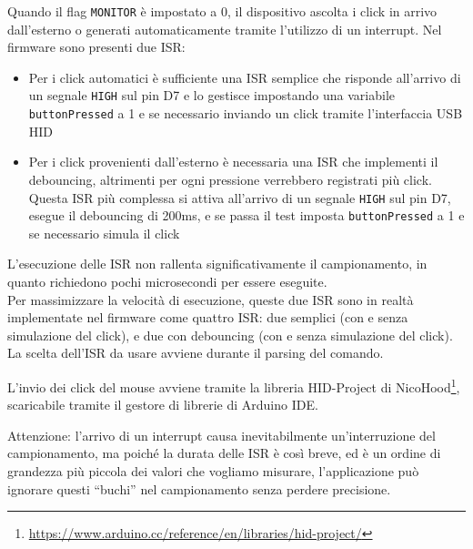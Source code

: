 Quando il flag \texttt{MONITOR} è impostato a 0, il dispositivo ascolta i click in arrivo dall'esterno o generati automaticamente tramite l'utilizzo di un interrupt. Nel firmware sono presenti due ISR:\begin{itemize}
	\item Per i click automatici è sufficiente una ISR semplice che risponde all'arrivo di un segnale \texttt{HIGH} sul pin D7 e lo gestisce impostando una variabile \texttt{buttonPressed} a 1 e se necessario inviando un click tramite l'interfaccia USB HID
	\item Per i click provenienti dall'esterno è necessaria una ISR che implementi il debouncing, altrimenti per ogni pressione verrebbero registrati più click. Questa ISR più complessa si attiva all'arrivo di un segnale \texttt{HIGH} sul pin D7, esegue il debouncing di 200ms, e se passa il test imposta \texttt{buttonPressed} a 1 e se necessario simula il click
\end{itemize}

L'esecuzione delle ISR non rallenta significativamente il campionamento, in quanto richiedono pochi microsecondi per essere eseguite.\\
Per massimizzare la velocità di esecuzione, queste due ISR sono in realtà implementate nel firmware come quattro ISR: due semplici (con e senza simulazione del click), e due con debouncing (con e senza simulazione del click). La scelta dell'ISR da usare avviene durante il parsing del comando.

L'invio dei click del mouse avviene tramite la libreria HID-Project di NicoHood\footnote{\href{https://www.arduino.cc/reference/en/libraries/hid-project/}{https://www.arduino.cc/reference/en/libraries/hid-project/}}, scaricabile tramite il gestore di librerie di Arduino IDE.

Attenzione: l'arrivo di un interrupt causa inevitabilmente un'interruzione del campionamento, ma poiché la durata delle ISR è così breve, ed è un ordine di grandezza più piccola dei valori che vogliamo misurare, l'applicazione può ignorare questi ``buchi'' nel campionamento senza perdere precisione.

